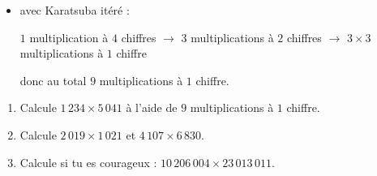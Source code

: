 \documentclass[class=report,crop=false, 12pt]{standalone}
\begin{document}
\begin{activite}
\begin{itemize}
  
  \item avec Karatsuba itéré :
   
    \centerline{\small
  $1$ multiplication à $4$ chiffres 
  $\longrightarrow$ $3$ \og multiplications à $2$ chiffres\fg{}
  $\longrightarrow$ $3 \times 3$ \og multiplications à $1$ chiffre\fg{}
  }
  donc au total $9$ \og multiplications à $1$ chiffre\fg{}.
  
\end{itemize}


\begin{enumerate} 
  \item Calcule $1\,234 \times 5\,041$ à l'aide de $9$ \og multiplications à $1$ chiffre\fg{}.
  \item Calcule $2\,019 \times 1\,021$ et  $4\,107 \times 6\,830$.
  \item Calcule si tu es courageux : $10\,206\,004 \times 23\,013\,011$.
\end{enumerate}
  
\end{activite}
\end{document}
